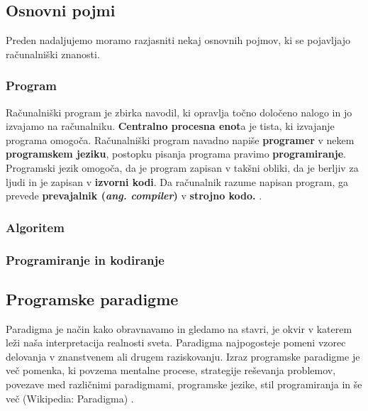 
\subsection{Osnovni pojmi}
\label{sec:kaj_je_programiranje}


Preden nadaljujemo moramo razjasniti nekaj osnovnih pojmov, ki se
pojavljajo računalniški znanosti.

\subsubsection{Program}
\label{sec:program}

Računalniški program je zbirka navodil, ki opravlja točno določeno
nalogo in jo izvajamo na računalniku. \textbf{Centralno procesna
  enot}a je tista, ki izvajanje programa omogoča. Računalniški program
navadno napiše \textbf{programer} v nekem \textbf{programskem jeziku},
postopku pisanja programa pravimo \textbf{programiranje}. Programski
jezik omogoča, da je program zapisan v takšni obliki, da je berljiv za
ljudi in je zapisan v \textbf{izvorni kodi}. Da računalnik razume
napisan program, ga prevede \textbf{prevajalnik
  (\emph{ang. compiler})} v \textbf{strojno kodo.}
\cite{wiki:computer_program}.

\subsubsection{Algoritem}
\label{sec:algoritem}





\subsubsection{Programiranje in kodiranje}
\label{sec:programiranje_kodiranje}


\subsection{Programske paradigme}
\label{sec:programske_paradigme}

Paradigma je način kako obravnavamo in gledamo na stavri, je okvir v
katerem leži naša interpretacija realnosti sveta. Paradigma
najpogosteje pomeni vzorec delovanja v znanstvenem ali drugem
raziskovanju.  Izraz programske paradigme je več pomenka, ki povzema
mentalne procese, strategije reševanja problemov, povezave med
različnimi paradigmami, programske jezike, stil programiranja in še
več (Wikipedia: Paradigma) \cite{guideTCS}.

